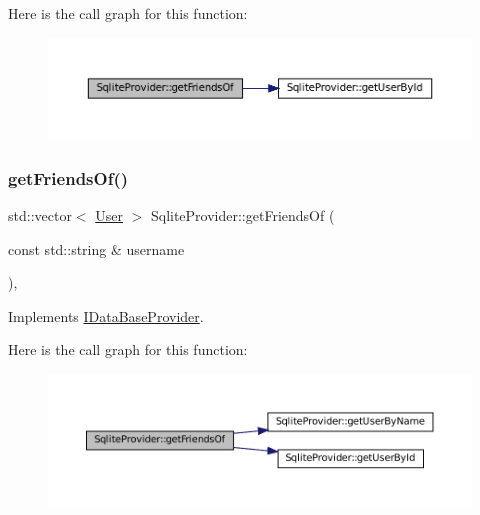 Here is the call graph for this function\+:
\nopagebreak
\begin{figure}[H]
\begin{center}
\leavevmode
\includegraphics[width=350pt]{classSqliteProvider_a639fb7f9341b668d17917711fc5ae39a_cgraph}
\end{center}
\end{figure}
\mbox{\label{classSqliteProvider_a19b97c70f002b84aa6a41d2d2dc9c44d}} 
\subsubsection{\texorpdfstring{get\+Friends\+Of()}{getFriendsOf()}\hspace{0.1cm}{\footnotesize\ttfamily [2/2]}}
{\footnotesize\ttfamily std\+::vector$<$ \mbox{\hyperlink{structUser}{User}} $>$ Sqlite\+Provider\+::get\+Friends\+Of (\begin{DoxyParamCaption}\item[{const std\+::string \&}]{username }\end{DoxyParamCaption})\hspace{0.3cm}{\ttfamily [override]}, {\ttfamily [virtual]}}



Implements \mbox{\hyperlink{classIDataBaseProvider_a75f39a7b7596d952c0890dd5b3549569}{I\+Data\+Base\+Provider}}.

Here is the call graph for this function\+:
\nopagebreak
\begin{figure}[H]
\begin{center}
\leavevmode
\includegraphics[width=350pt]{classSqliteProvider_a19b97c70f002b84aa6a41d2d2dc9c44d_cgraph}
\end{center}
\end{figure}
\mbox{\label{classSqliteProvider_a199db7e0313f5e485fcf67d5a9864233}} 
